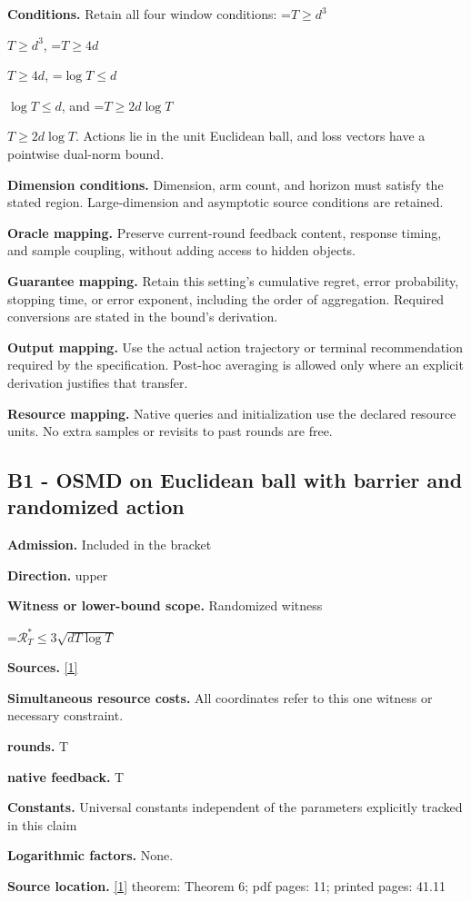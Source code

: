 \documentclass[10pt,a4paper]{article}
\newcommand{\AtlasMath}[1]{\par\begingroup\centering\setbox0=\hbox{$\displaystyle #1$}\ifdim\wd0>1.4\linewidth\typeout{ATLAS WIDE FORMULA: \the\wd0}\fi\ifdim\wd0>\linewidth\resizebox{\linewidth}{!}{\box0}\else\box0\fi\par\endgroup}
\newcommand{\AtlasInlineMath}[1]{\begingroup\setbox0=\hbox{$#1$}\ifdim\wd0>.4\linewidth\endgroup\AtlasMath{#1}\else\endgroup$#1$\fi}
\begin{document}
\textbf{Conditions.} Retain all four window conditions: \AtlasInlineMath{T\ge d^3}, \AtlasInlineMath{T\ge4d}, \AtlasInlineMath{\log T\le d}, and \AtlasInlineMath{T\ge2d\log T}. Actions lie in the unit Euclidean ball, and loss vectors have a pointwise dual-norm bound.

\textbf{Dimension conditions.} Dimension, arm count, and horizon must satisfy the stated region. Large-dimension and asymptotic source conditions are retained.

\textbf{Oracle mapping.} Preserve current-round feedback content, response timing, and sample coupling, without adding access to hidden objects.

\textbf{Guarantee mapping.} Retain this setting's cumulative regret, error probability, stopping time, or error exponent, including the order of aggregation. Required conversions are stated in the bound's derivation.

\textbf{Output mapping.} Use the actual action trajectory or terminal recommendation required by the specification. Post-hoc averaging is allowed only where an explicit derivation justifies that transfer.

\textbf{Resource mapping.} Native queries and initialization use the declared resource units. No extra samples or revisits to past rounds are free.

\subsection{B1 - OSMD on Euclidean ball with barrier and randomized action}
\textbf{Admission.} Included in the bracket

\textbf{Direction.} upper

\textbf{Witness or lower-bound scope.} Randomized witness

\AtlasMath{\mathcal{R}_T^*\le3\sqrt{dT\log T}}
\textbf{Sources.} \href{https://proceedings.mlr.press/v23/bubeck12a/bubeck12a.pdf}{[1]}

\textbf{Simultaneous resource costs.} All coordinates refer to this one witness or necessary constraint.

\textbf{rounds.} T

\textbf{native feedback.} T

\textbf{Constants.} Universal constants independent of the parameters explicitly tracked in this claim

\textbf{Logarithmic factors.} None.

\textbf{Source location.} \href{https://proceedings.mlr.press/v23/bubeck12a/bubeck12a.pdf}{[1]} theorem: Theorem 6; pdf pages: 11; printed pages: 41.11
\end{document}
